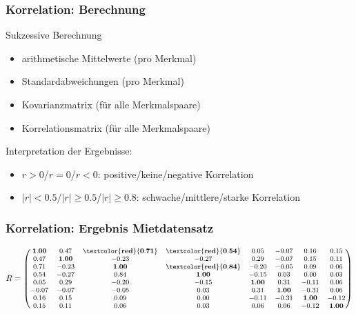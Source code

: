 \documentclass{beamer}
\begin{document}
\begin{frame}
  \frametitle{Korrelation: Berechnung}
	
	\begin{block}{Sukzessive Berechnung}
		\begin{itemize}
			\item arithmetische Mittelwerte (pro Merkmal)
			\item Standardabweichungen (pro Merkmal)
			\item Kovarianzmatrix (für alle Merkmalspaare)
			\item Korrelationsmatrix (für alle Merkmalspaare)
		\end{itemize}
	\end{block}
	
	Interpretation der Ergebnisse:
	
	\begin{itemize}
		\item $r>0$/$r=0$/$r<0$: positive/keine/negative Korrelation
		\item $|r|<0.5$/$|r|\geq0.5$/$|r|\geq0.8$: schwache/mittlere/starke Korrelation
	\end{itemize}
\end{frame}

\begin{frame}
  \frametitle{Korrelation: Ergebnis Mietdatensatz}
  
  \begin{equation*}
		R =
		\begin{footnotesize}
			\begin{pmatrix}
				{\bf 1.00} & 0.47 & {\bf \textcolor{red}{0.71}} & {\bf \textcolor{red}{0.54}} & 0.05 & -0.07 & 0.16 & 0.15\\
   			0.47 & {\bf 1.00} & -0.23 & -0.27 & 0.29 & -0.07 & 0.15 & 0.11\\
  	 		0.71 & -0.23 & {\bf 1.00} & {\bf \textcolor{red}{0.84}} & -0.20 & -0.05 & 0.09 & 0.06\\
	   		0.54 & -0.27 & 0.84 & {\bf 1.00} & -0.15 & 0.03 & 0.00 & 0.03\\
  	 		0.05 &  0.29 & -0.20 & -0.15 & {\bf 1.00} & 0.31 & -0.11 & 0.06\\
  			-0.07 & -0.07 & -0.05 & 0.03 & 0.31 & {\bf 1.00} & -0.31 & 0.06\\
				0.16 &  0.15 & 0.09 & 0.00 & -0.11 & -0.31 & {\bf 1.00} & -0.12\\
  			0.15 &  0.11 & 0.06 & 0.03 & 0.06 & 0.06 & -0.12 & {\bf 1.00}\\
			\end{pmatrix}
		\end{footnotesize}
	\end{equation*}

\end{frame}
\end{document}
